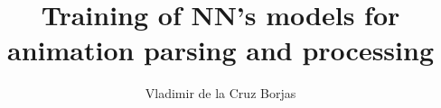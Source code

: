 \documentclass[letterpaper,11pt,onecolumn,final]{report}              %
\author{Vladimir de la Cruz Borjas}    %
\title{Training of NN's models for animation parsing and processing}    %
\begin{document}
	








\appendix
\setcounter{table}{0}		%
\setcounter{figure}{0}		%
\renewcommand{\thefigure}{\Alph{chapter}.\arabic{figure}} 	%
\renewcommand{\thetable}{\Alph{chapter}.\arabic{table}}		%

\begin{appendices}
    
\end{appendices}




\end{document}
